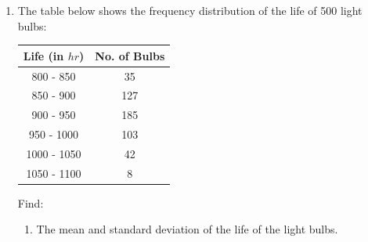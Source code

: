 \documentclass{report}
\begin{document}
\begin{multicols}{2}
\begin{enumerate}
    \item The table below shows the frequency distribution of the life of 500 light
          bulbs:
          \begin{center}
            \begin{tabular}{|c|c|}
              \hline
              Life (in $hr$) & No. of Bulbs \\
              \hline
              800 - 850      & 35           \\
              850 - 900      & 127          \\
              900 - 950      & 185          \\
              950 - 1000     & 103          \\
              1000 - 1050    & 42           \\
              1050 - 1100    & 8            \\
              \hline
            \end{tabular}
          \end{center}
          Find:
          \begin{enumerate}
            \item The mean and standard deviation of the life of the light bulbs. \sol{}
                  \begin{center}
\end{center}
\end{enumerate}
\end{enumerate}
\end{multicols}
\end{document}
